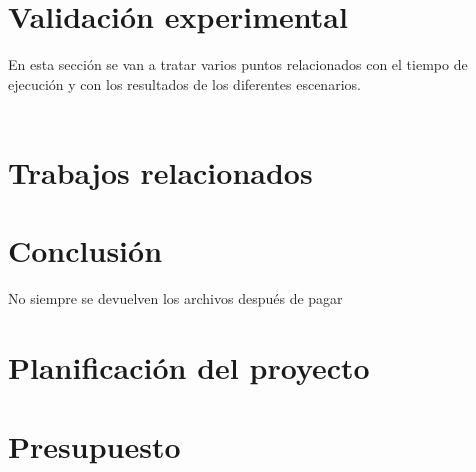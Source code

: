 \documentclass[a4paper,12pt]{article}
\begin{document}
\section{Validación experimental}
En esta sección se van a tratar varios puntos relacionados con el tiempo de ejecución y con los resultados de los diferentes escenarios.\\\\

\section{Trabajos relacionados}
\section{Conclusión}
No siempre se devuelven los archivos después de pagar
\appendix
\section{Planificación del proyecto}
\section{Presupuesto}
\end{document}
